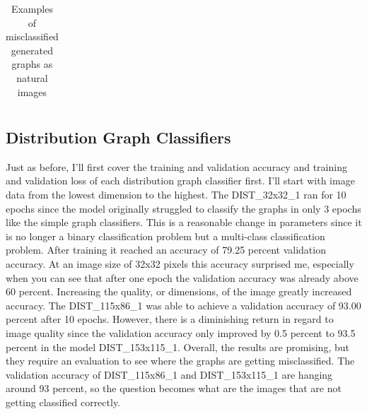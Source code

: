 \documentclass[12pt]{article}
\begin{document}
\begin{table}
\begin{center}
\begin{tabular}{ c  c }
                    \end{tabular}

                    \caption{Examples of misclassified generated graphs as natural images}
                    \label{mis-gen-in-cifar-scp-1-examples}

                \end{center}

            \end{table}


        \subsection{Distribution Graph Classifiers}

       
            Just as before, I’ll first cover the training and validation accuracy 
            and training and validation loss of each distribution graph classifier first. 
            I’ll start with image data from the lowest dimension to the highest. 
            The DIST\_32x32\_1 ran for 10 epochs since the model originally struggled to classify the graphs in only 3 epochs 
            like the simple graph classifiers. This is a reasonable change in parameters 
            since it is no longer a binary classification problem but a multi-class classification problem. 
            After training it reached an accuracy of 79.25 percent validation accuracy. 
            At an image size of 32x32 pixels this accuracy surprised me, 
            especially when you can see that after one epoch the validation accuracy was already above 60 percent. 
            Increasing the quality, or dimensions, of the image greatly increased accuracy. 
            The DIST\_115x86\_1 was able to achieve a validation accuracy of 93.00 percent after 10 epochs. 
            However, there is a diminishing return in regard to image quality 
            since the validation accuracy only improved by 0.5 percent to 93.5 percent in the model DIST\_153x115\_1. 
            Overall, the results are promising, but they require an evaluation to see where the graphs are getting misclassified. 
            The validation accuracy of DIST\_115x86\_1 and DIST\_153x115\_1 are hanging around 93 percent, 
            so the question becomes what are the images that are not getting classified correctly. 
            
\end{document}
